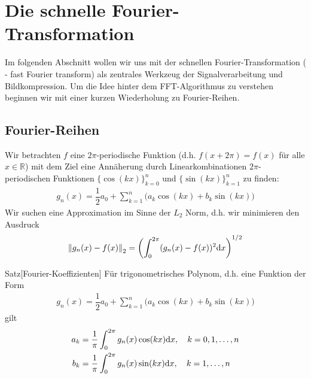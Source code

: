 
\section{Die schnelle Fourier-Transformation}

Im folgenden Abschnitt wollen wir uns mit der schnellen Fourier-Transformation ( - fast Fourier transform) 
als zentrales Werkzeug der Signalverarbeitung und Bildkompression. 
Um die Idee hinter dem FFT-Algorithmus zu verstehen beginnen wir mit einer kurzen Wiederholung zu Fourier-Reihen.

\subsection{Fourier-Reihen}
Wir betrachten $f$ eine $2\pi$-periodische Funktion (d.h. $f(x+2\pi)=f(x)$ für alle $x\in\mathbb{R}$) mit 
dem Ziel eine Annäherung durch Linearkombinationen $2\pi$-periodischen Funktionen $\{\cos(kx)\}_{k=0}^{n}$ und 
$\{\sin(kx)\}_{k=1}^{n}$ zu finden:
%
\begin{align*}
  g_n(x) = \dfrac{1}{2}a_0 + \sum_{k=1}^{n}\Big(a_k\cos(kx)+b_k\sin(kx)\Big)
\end{align*}
%
Wir suchen eine Approximation im Sinne der $L_2$ Norm, d.h. wir minimieren den Ausdruck
%
\begin{align*}
  \vertn{2}{g_n(x)-f(x)}_2 = \left(\int_{0}^{2\pi} (g_n(x)-f(x))^2 \diff x\right)^{1/2}
\end{align*}

\begin{colbox}{Satz}[Fourier-Koeffizienten]
  Für trigonometrisches Polynom, d.h. eine Funktion der Form  
  \begin{align*}
    g_n(x) = \dfrac{1}{2}a_0 + \sum_{k=1}^{n}\Big(a_k\cos(kx)+b_k\sin(kx)\Big)
  \end{align*}
  gilt 
  \begin{align*}
    a_k 
    &= \dfrac{1}{\pi} \int_{0}^{2\pi} g_n(x)\cos(kx) \text{d} x, \quad k=0,1,\dots,n \\
    b_k 
    &= \dfrac{1}{\pi} \int_{0}^{2\pi} g_n(x)\sin(kx) \text{d} x, \quad k=1,\dots,n 
  \end{align*}
\end{colbox}

